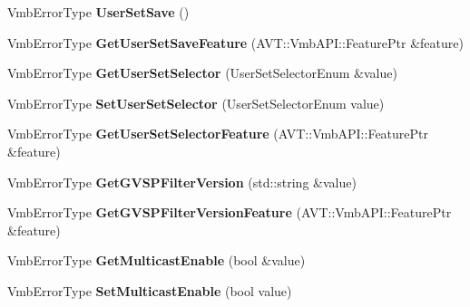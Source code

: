 \begin{DoxyCompactItemize}
\item 
\hypertarget{classMakoCamera_a37a54a0e5f15588880878ca5dd42d621}{Vmb\-Error\-Type {\bfseries User\-Set\-Save} ()}\label{classMakoCamera_a37a54a0e5f15588880878ca5dd42d621}

\item 
\hypertarget{classMakoCamera_ae9e5b8ff0fa2f854e3ba1b873eeb7b7c}{Vmb\-Error\-Type {\bfseries Get\-User\-Set\-Save\-Feature} (A\-V\-T\-::\-Vmb\-A\-P\-I\-::\-Feature\-Ptr \&feature)}\label{classMakoCamera_ae9e5b8ff0fa2f854e3ba1b873eeb7b7c}

\item 
\hypertarget{classMakoCamera_ab77159be73b68098b485991239cc1751}{Vmb\-Error\-Type {\bfseries Get\-User\-Set\-Selector} (User\-Set\-Selector\-Enum \&value)}\label{classMakoCamera_ab77159be73b68098b485991239cc1751}

\item 
\hypertarget{classMakoCamera_a1b6031373d413e4516e36650ecaa6c5f}{Vmb\-Error\-Type {\bfseries Set\-User\-Set\-Selector} (User\-Set\-Selector\-Enum value)}\label{classMakoCamera_a1b6031373d413e4516e36650ecaa6c5f}

\item 
\hypertarget{classMakoCamera_a6a380f844b121cfc0152708cb227139c}{Vmb\-Error\-Type {\bfseries Get\-User\-Set\-Selector\-Feature} (A\-V\-T\-::\-Vmb\-A\-P\-I\-::\-Feature\-Ptr \&feature)}\label{classMakoCamera_a6a380f844b121cfc0152708cb227139c}

\item 
\hypertarget{classMakoCamera_a3ef094fb0089a3e3b4a06a58a47f63e1}{Vmb\-Error\-Type {\bfseries Get\-G\-V\-S\-P\-Filter\-Version} (std\-::string \&value)}\label{classMakoCamera_a3ef094fb0089a3e3b4a06a58a47f63e1}

\item 
\hypertarget{classMakoCamera_ac87293ab6c750f387e006fd40da838fa}{Vmb\-Error\-Type {\bfseries Get\-G\-V\-S\-P\-Filter\-Version\-Feature} (A\-V\-T\-::\-Vmb\-A\-P\-I\-::\-Feature\-Ptr \&feature)}\label{classMakoCamera_ac87293ab6c750f387e006fd40da838fa}

\item 
\hypertarget{classMakoCamera_a5edf2d80c865874ed65c270c790177a0}{Vmb\-Error\-Type {\bfseries Get\-Multicast\-Enable} (bool \&value)}\label{classMakoCamera_a5edf2d80c865874ed65c270c790177a0}

\item 
\hypertarget{classMakoCamera_ac34ac1317ca8e19d63a0b99551981cf0}{Vmb\-Error\-Type {\bfseries Set\-Multicast\-Enable} (bool value)}\label{classMakoCamera_ac34ac1317ca8e19d63a0b99551981cf0}


\end{DoxyCompactItemize}
